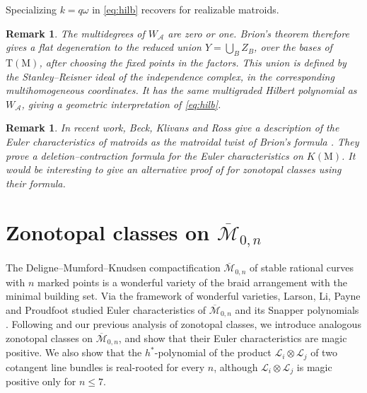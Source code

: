 \documentclass[11pt,a4paper,reqno]{amsart}
\theoremstyle{results}
\theoremstyle{definitions}
\newtheorem{remark}[thm]{Remark}
\def\calA{\mathcal{A}}
\newcommand{\M}{\mathrm{M}}
\newcommand{\hstar}{h^{*}}
\newcommand{\cL}{\mathcal{L}}
\newcommand{\DT}{\mathrm{T}}      %
\newcommand{\Mbar}{\overline{\mathcal M}}
\begin{document}
Specializing $k=q\omega$ in \eqref{eq:hilb} recovers
 for realizable matroids.


\begin{remark}\label{rem:degeneration}
  The multidegrees of $W_{\calA}$ are zero or one. Brion's theorem
  \cite[Theorem 1]{brion2003multiplicity} therefore gives a flat degeneration
  to the reduced union $Y=\bigcup_B Z_B$, over the bases of $\DT(\M)$,
  after choosing the fixed points in the factors. This union is defined by
  the Stanley--Reisner ideal of the independence complex, in the corresponding
  multihomogeneous coordinates. It has the same multigraded Hilbert
  polynomial as $W_{\calA}$, giving a geometric interpretation of
  \eqref{eq:hilb}.
\end{remark}

\begin{remark}
In recent work, Beck,
Klivans and Ross \cite{beck2026matroidal} give a description of the Euler characteristics of matroids as the \emph{matroidal twist} of Brion's formula \cite{brion1988points}.  They prove a deletion--contraction formula
\cite[Theorem 1.2]{beck2026matroidal} for the Euler characteristics on $K(\M)$. It would be interesting to give an alternative proof of  for zonotopal classes using their formula.
\end{remark}

\section{Zonotopal classes on \texorpdfstring{$\overline{\mathcal M}_{0,n}$}{the moduli space of stable rational curves}}
\label{sec:m0n}

The Deligne--Mumford--Knudsen compactification $\Mbar_{0,n}$ of stable rational
curves with $n$ marked points is a wonderful variety of the braid arrangement with
the minimal building set.  Via the framework of wonderful varieties, Larson, Li,
Payne and Proudfoot studied Euler characteristics of $\Mbar_{0,n}$ and its Snapper
polynomials \cite[\S 9]{larson2024k}.  Following \cite{larson2024k} and our
previous analysis of zonotopal classes, we introduce analogous zonotopal classes
on $\Mbar_{0,n}$, and show that their Euler characteristics are magic positive.
We also show that the $\hstar$-polynomial of the product $\cL_i \otimes \cL_j$ of
two cotangent line bundles is real-rooted for every $n$, although
$\cL_i \otimes \cL_j$ is magic positive only for $n \leqslant 7$.
\end{document}
